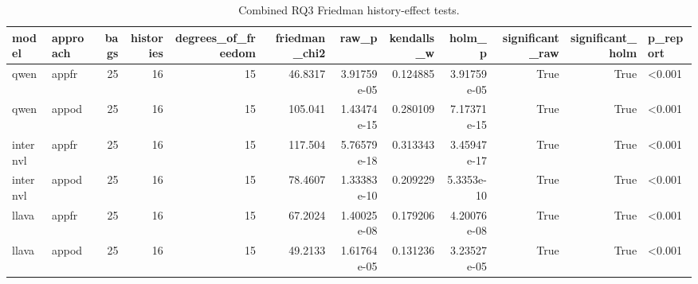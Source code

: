 \begin{table}[tbp]
\caption{Combined RQ3 Friedman history-effect tests.}
\label{tab:rq3-friedman}
\begin{tabular}{llrrrrrrrrrl}
\toprule
model & approach & bags & histories & degrees\_of\_freedom & friedman\_chi2 & raw\_p & kendalls\_w & holm\_p & significant\_raw & significant\_holm & p\_report \\
\midrule
qwen & appfr & 25 & 16 & 15 & 46.8317 & 3.91759e-05 & 0.124885 & 3.91759e-05 & True & True & <0.001 \\
qwen & appod & 25 & 16 & 15 & 105.041 & 1.43474e-15 & 0.280109 & 7.17371e-15 & True & True & <0.001 \\
internvl & appfr & 25 & 16 & 15 & 117.504 & 5.76579e-18 & 0.313343 & 3.45947e-17 & True & True & <0.001 \\
internvl & appod & 25 & 16 & 15 & 78.4607 & 1.33383e-10 & 0.209229 & 5.3353e-10 & True & True & <0.001 \\
llava & appfr & 25 & 16 & 15 & 67.2024 & 1.40025e-08 & 0.179206 & 4.20076e-08 & True & True & <0.001 \\
llava & appod & 25 & 16 & 15 & 49.2133 & 1.61764e-05 & 0.131236 & 3.23527e-05 & True & True & <0.001 \\
\bottomrule
\end{tabular}
\end{table}
